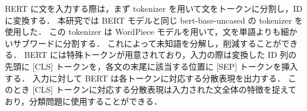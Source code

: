 BERT に文を入力する際は，まず tokenizer を用いて文をトークンに分割し，ID に変換する．
本研究では BERT モデルと同じ bert-base-uncased の tokenizer を使用した．
この tokenizer は WordPiece \cite{wu2016googles} モデルを用いて，文を単語よりも細かいサブワードに分割する．
これによって未知語を分解し，削減することができる．
BERT には特殊トークンが用意されており，入力の際は変換した ID 列の先頭に [CLS] トークンを，各文の末尾に該当する位置に [SEP] トークンを挿入する．
入力に対して BERT は各トークンに対応する分散表現を出力する．
このとき [CLS] トークンに対応する分散表現は入力された文全体の特徴を捉えており，分類問題に使用することができる．
